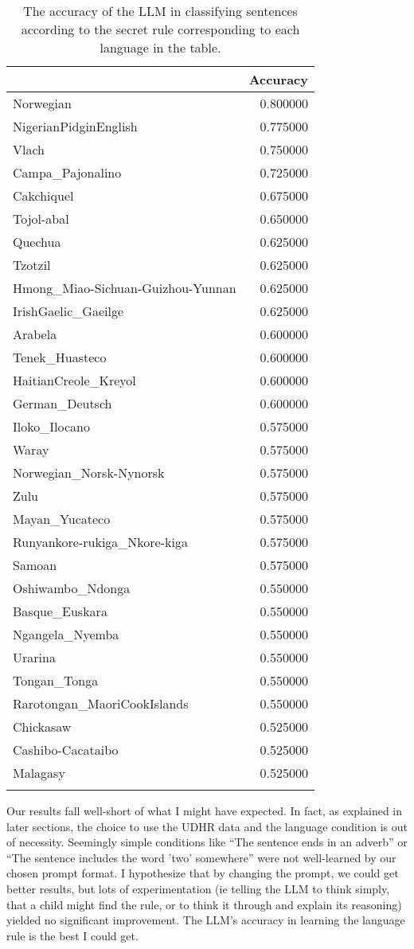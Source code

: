 \documentclass[titlepage, hidelinks, 12pt]{article}
\theoremstyle{plain}
\theoremstyle{remark}
\theoremstyle{definition}
\begin{document}
\begin{longtable}{lr}
\toprule
 & Accuracy \\
\midrule
Norwegian & 0.800000 \\
NigerianPidginEnglish & 0.775000 \\
Vlach & 0.750000 \\
Campa\_Pajonalino & 0.725000 \\
Cakchiquel & 0.675000 \\
Tojol-abal & 0.650000 \\
Quechua & 0.625000 \\
Tzotzil & 0.625000 \\
Hmong\_Miao-Sichuan-Guizhou-Yunnan & 0.625000 \\
IrishGaelic\_Gaeilge & 0.625000 \\
Arabela & 0.600000 \\
Tenek\_Huasteco & 0.600000 \\
HaitianCreole\_Kreyol & 0.600000 \\
German\_Deutsch & 0.600000 \\
Iloko\_Ilocano & 0.575000 \\
Waray & 0.575000 \\
Norwegian\_Norsk-Nynorsk & 0.575000 \\
Zulu & 0.575000 \\
Mayan\_Yucateco & 0.575000 \\
Runyankore-rukiga\_Nkore-kiga & 0.575000 \\
Samoan & 0.575000 \\
Oshiwambo\_Ndonga & 0.550000 \\
Basque\_Euskara & 0.550000 \\
Ngangela\_Nyemba & 0.550000 \\
Urarina & 0.550000 \\
Tongan\_Tonga & 0.550000 \\
Rarotongan\_MaoriCookIslands & 0.550000 \\
Chickasaw & 0.525000 \\
Cashibo-Cacataibo & 0.525000 \\
Malagasy & 0.525000 \\
\bottomrule
\caption{The accuracy of the LLM in classifying sentences according to the secret rule corresponding to each language in the table.}
\label{tab:accuracy}
\end{longtable}

Our results fall well-short of what I might have expected. In fact, as explained in later sections, the choice to use 
the UDHR data and the language condition is out of necessity. Seemingly simple conditions like ``The sentence ends in an adverb'' or
``The sentence includes the word 'two' somewhere'' were not well-learned by our chosen prompt format. I hypothesize that by changing
the prompt, we could get better results, but lots of experimentation (ie telling the LLM to think simply, that a child might find the
rule, or to think it through and explain its reasoning) yielded no significant improvement. The LLM's accuracy in learning the language
rule is the best I could get. 
\end{document}
